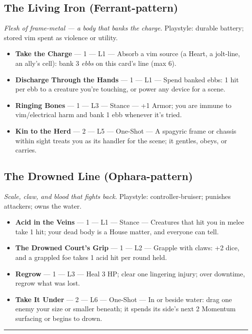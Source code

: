 \subsection{The Living Iron \textnormal{(Ferrant-pattern)}}
\textit{Flesh of frame-metal --- a body that banks the charge.} Playstyle: durable battery; stored vim spent as violence or utility.
\begin{itemize}
    \item \textbf{Take the Charge} --- 1 --- L1 --- Absorb a vim source (a Heart, a jolt-line, an ally's cell): bank 3 \textit{ebbs} on this card's line (max 6).
    \item \textbf{Discharge Through the Hands} --- 1 --- L1 --- Spend banked ebbs: 1 hit per ebb to a creature you're touching, or power any device for a scene.
    \item \textbf{Ringing Bones} --- 1 --- L3 --- Stance --- +1 Armor; you are immune to vim/electrical harm and bank 1 ebb whenever it's tried.
    \item \textbf{Kin to the Herd} --- 2 --- L5 --- One-Shot --- A spagyric frame or chassis within sight treats you as its handler for the scene; it gentles, obeys, or carries.
\end{itemize}

\subsection{The Drowned Line \textnormal{(Ophara-pattern)}}
\textit{Scale, claw, and blood that fights back.} Playstyle: controller-bruiser; punishes attackers; owns the water.
\begin{itemize}
    \item \textbf{Acid in the Veins} --- 1 --- L1 --- Stance --- Creatures that hit you in melee take 1 hit; your dead body is a House matter, and everyone can tell.
    \item \textbf{The Drowned Court's Grip} --- 1 --- L2 --- Grapple with claws: +2 dice, and a grappled foe takes 1 acid hit per round held.
    \item \textbf{Regrow} --- 1 --- L3 --- Heal 3 HP; clear one lingering injury; over downtime, regrow what was lost.
    \item \textbf{Take It Under} --- 2 --- L6 --- One-Shot --- In or beside water: drag one enemy your size or smaller beneath; it spends its side's next 2 Momentum surfacing or begins to drown.
\end{itemize}

\medskip\hrule\medskip

